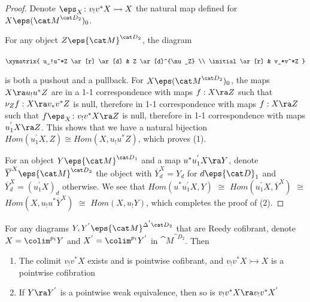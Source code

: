 \begin{proof}
Denote $\eps_X \colon v_!v^*X \rightarrowtail X$ the natural map defined for $X \eps ({\cat M}^{{\cat D}_2})_0$.

For any object $Z \eps {\cat M}^{{\cat D}_2}$, the diagram 
\begin{center}
$\xymatrix{
    u_!u^*Z \ar[r] \ar[d] & Z \ar[d]^{\nu_Z} \\
    \initial \ar[r] & v_*v^*Z
  }$
\end{center}
is both a pushout and a pullback. For $X \eps ({\cat M}^{{\cat D}_2})_0$, the maps $X \ra u_!u^*Z$ are in a 1-1 correspondence with maps $f: X \ra Z$ such that $\nu_Z f: X \ra v_*v^*Z$ is null, therefore in 1-1 correspondence with maps $f: X \ra Z$ such that $f\eps_X \colon v_!v^*X \ra Z$ is null, therefore in 1-1 correspondence with maps $u^{'}_1 X \ra Z$. This shows that we have a natural bijection $Hom (u^{'}_1 X, Z) \cong Hom (X, u_!u^*Z)$, which proves (1). 

For an object $Y \eps {\cat M}^{{\cat D}_1}$ and a map $u^*u^{'}_1 X \ra Y$, denote $\overline{Y}^{X} \eps {\cat M}^{{\cat D}_2}$ the object with $\overline{Y}^{X}_{d} = Y_d$ for $d \eps {\cat D}_1$ and $\overline{Y}^{X}_{d} = (u^{'}_1 X)_d$ otherwise. We see that $Hom (u^*u^{'}_1 X, Y)$ $\cong$ $Hom (u^{'}_1 X, \overline{Y}^{X})$ $\cong$ $Hom (X, u_!u^*\overline{Y}^{X})$ $\cong$ $Hom (X, u_!Y)$, which completes the proof of (2).
\end{proof}

\begin{lem}
\label{lem:leftadjointoflcolim2}
For any diagrams $Y, Y^{'} \eps {\cat M}^{\Delta^{'}{\cat D}_2}$ that are Reedy cofibrant, denote $X = \colim^{p_t} Y$ and $X^{'} = \colim^{p_t} Y^{'}$ in ${\cat M}^{{\cat D}_2}$. Then
\begin{enumerate}
\item
The colimit $v_!v^*X$ exists and is pointwise cofibrant, and $v_!v^*X \rightarrowtail X$ is a pointwise cofibration
\item
If $Y \ra Y^{'}$ is a pointwise weak equivalence, then so is $v_!v^*X \ra v_!v^*X^{'}$
\end{enumerate}
\end{lem}

